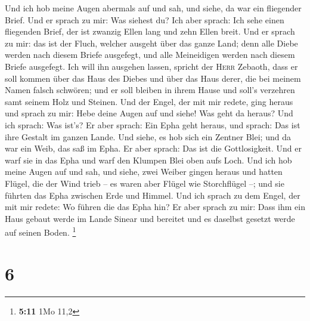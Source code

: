  Und ich hob meine Augen abermals auf und sah, und siehe,
da war ein fliegender Brief.  Und er sprach zu mir: Was
siehest du? Ich aber sprach: Ich sehe einen fliegenden Brief, der ist
zwanzig Ellen lang und zehn Ellen breit.  Und er sprach zu
mir: das ist der Fluch, welcher ausgeht über das ganze Land; denn alle
Diebe werden nach diesem Briefe ausgefegt, und alle Meineidigen werden
nach diesem Briefe ausgefegt.  Ich will ihn ausgehen
lassen, spricht der \textsc{Herr} Zebaoth, dass er soll kommen über das
Haus des Diebes und über das Haus derer, die bei meinem Namen falsch
schwören; und er soll bleiben in ihrem Hause und soll's verzehren samt
seinem Holz und Steinen.  Und der Engel, der mit mir
redete, ging heraus und sprach zu mir: Hebe deine Augen auf und siehe!
Was geht da heraus?  Und ich sprach: Was ist's? Er aber
sprach: Ein Epha geht heraus, und sprach: Das ist ihre Gestalt im ganzen
Lande.  Und siehe, es hob sich ein Zentner Blei; und da
war ein Weib, das saß im Epha.  Er aber sprach: Das ist
die Gottlosigkeit. Und er warf sie in das Epha und warf den Klumpen Blei
oben aufs Loch.  Und ich hob meine Augen auf und sah, und
siehe, zwei Weiber gingen heraus und hatten Flügel, die der Wind trieb
-- es waren aber Flügel wie Storchflügel --; und sie führten das Epha
zwischen Erde und Himmel.  Und ich sprach zu dem Engel,
der mit mir redete: Wo führen die das Epha hin?  Er aber
sprach zu mir: Dass ihm ein Haus gebaut werde im Lande Sinear und
bereitet und es daselbst gesetzt werde auf seinen Boden. \footnote{\textbf{5:11}
  1Mo 11,2}

\hypertarget{section-5}{%
\section{6}\label{section-5}}


